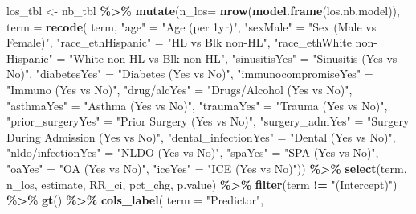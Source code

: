 \documentclass[
]{article}
\newenvironment{Shaded}{\begin{snugshade}}{\end{snugshade}}
\newcommand{\AttributeTok}[1]{\textcolor[rgb]{0.13,0.29,0.53}{#1}}
\newcommand{\FunctionTok}[1]{\textcolor[rgb]{0.13,0.29,0.53}{\textbf{#1}}}
\newcommand{\NormalTok}[1]{#1}
\newcommand{\OtherTok}[1]{\textcolor[rgb]{0.56,0.35,0.01}{#1}}
\newcommand{\SpecialCharTok}[1]{\textcolor[rgb]{0.81,0.36,0.00}{\textbf{#1}}}
\newcommand{\StringTok}[1]{\textcolor[rgb]{0.31,0.60,0.02}{#1}}
\begin{document}
\begin{Shaded}
\begin{Highlighting}[]
\NormalTok{los\_tbl }\OtherTok{\textless{}{-}}\NormalTok{ nb\_tbl }\SpecialCharTok{\%\textgreater{}\%}
  \FunctionTok{mutate}\NormalTok{(}\AttributeTok{n\_los=} \FunctionTok{nrow}\NormalTok{(}\FunctionTok{model.frame}\NormalTok{(los.nb.model)),}
      \AttributeTok{term =} \FunctionTok{recode}\NormalTok{(}
\NormalTok{        term,}
        \StringTok{"age"} \OtherTok{=} \StringTok{"Age (per 1yr)"}\NormalTok{,}
        \StringTok{"sexMale"} \OtherTok{=} \StringTok{"Sex (Male vs Female)"}\NormalTok{,}
        \StringTok{"race\_ethHispanic"} \OtherTok{=} \StringTok{"HL vs Blk non{-}HL"}\NormalTok{,}
        \StringTok{"race\_ethWhite non{-}Hispanic"} \OtherTok{=} \StringTok{"White non{-}HL vs Blk non{-}HL"}\NormalTok{,}
        \StringTok{"sinusitisYes"} \OtherTok{=} \StringTok{"Sinusitis (Yes vs No)"}\NormalTok{,}
        \StringTok{"diabetesYes"} \OtherTok{=} \StringTok{"Diabetes (Yes vs No)"}\NormalTok{,}
        \StringTok{"immunocompromiseYes"} \OtherTok{=} \StringTok{"Immuno (Yes vs No)"}\NormalTok{,}
        \StringTok{"\textasciigrave{}drug/alc\textasciigrave{}Yes"} \OtherTok{=} \StringTok{"Drugs/Alcohol (Yes vs No)"}\NormalTok{,}
        \StringTok{"asthmaYes"} \OtherTok{=} \StringTok{"Asthma (Yes vs No)"}\NormalTok{,}
        \StringTok{"traumaYes"} \OtherTok{=} \StringTok{"Trauma (Yes vs No)"}\NormalTok{,}
        \StringTok{"prior\_surgeryYes"} \OtherTok{=} \StringTok{"Prior Surgery (Yes vs No)"}\NormalTok{,}
        \StringTok{"surgery\_admYes"} \OtherTok{=} \StringTok{"Surgery During Admission (Yes vs No)"}\NormalTok{,}
        \StringTok{"dental\_infectionYes"} \OtherTok{=} \StringTok{"Dental (Yes vs No)"}\NormalTok{,}
        \StringTok{"\textasciigrave{}nldo/infection\textasciigrave{}Yes"} \OtherTok{=} \StringTok{"NLDO (Yes vs No)"}\NormalTok{,}
        \StringTok{"spaYes"} \OtherTok{=} \StringTok{"SPA (Yes vs No)"}\NormalTok{,}
        \StringTok{"oaYes"} \OtherTok{=} \StringTok{"OA (Yes vs No)"}\NormalTok{,}
        \StringTok{"iceYes"} \OtherTok{=} \StringTok{"ICE (Yes vs No)"}\NormalTok{)) }\SpecialCharTok{\%\textgreater{}\%} 
  \FunctionTok{select}\NormalTok{(term, n\_los, estimate, RR\_ci, pct\_chg, p.value) }\SpecialCharTok{\%\textgreater{}\%}
  \FunctionTok{filter}\NormalTok{(term }\SpecialCharTok{!=} \StringTok{"(Intercept)"}\NormalTok{) }\SpecialCharTok{\%\textgreater{}\%} 
  \FunctionTok{gt}\NormalTok{() }\SpecialCharTok{\%\textgreater{}\%}
  \FunctionTok{cols\_label}\NormalTok{(}
    \AttributeTok{term =} \StringTok{"Predictor"}\NormalTok{,}

\end{Highlighting}
\end{Shaded}
\end{document}
